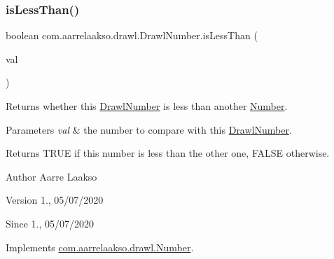 \subsubsection{\texorpdfstring{is\+Less\+Than()}{isLessThan()}\hspace{0.1cm}{\footnotesize\ttfamily [1/2]}}
{\footnotesize\ttfamily boolean com.\+aarrelaakso.\+drawl.\+Drawl\+Number.\+is\+Less\+Than (\begin{DoxyParamCaption}\item[{@Not\+Null final \hyperlink{interfacecom_1_1aarrelaakso_1_1drawl_1_1_number}{Number}}]{val }\end{DoxyParamCaption})}



Returns whether this \hyperlink{classcom_1_1aarrelaakso_1_1drawl_1_1_drawl_number}{Drawl\+Number} is less than another \hyperlink{interfacecom_1_1aarrelaakso_1_1drawl_1_1_number}{Number}. 


\begin{DoxyParams}{Parameters}
{\em val} & the number to compare with this \hyperlink{classcom_1_1aarrelaakso_1_1drawl_1_1_drawl_number}{Drawl\+Number}. \\
\hline
\end{DoxyParams}
\begin{DoxyReturn}{Returns}
{\ttfamily T\+R\+UE} if this number is less than the other one, {\ttfamily F\+A\+L\+SE} otherwise. 
\end{DoxyReturn}
\begin{DoxyAuthor}{Author}
Aarre Laakso 
\end{DoxyAuthor}
\begin{DoxyVersion}{Version}
1., 05/07/2020 
\end{DoxyVersion}
\begin{DoxySince}{Since}
1., 05/07/2020 
\end{DoxySince}


Implements \hyperlink{interfacecom_1_1aarrelaakso_1_1drawl_1_1_number_acc7fec3a209cb27e09a45f17ed9fd4e1}{com.\+aarrelaakso.\+drawl.\+Number}.

\mbox{\label{classcom_1_1aarrelaakso_1_1drawl_1_1_drawl_number_a01bc433270b27f6b50ea59fd0d5fcc90}} 
